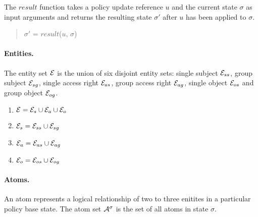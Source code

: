 \documentclass[10pt, twocolumn]{article}
\begin{document}
        The $result$ function takes a policy update reference $u$ and the
        current state $\sigma$ as input arguments and returns the resulting
        state $\sigma'$ after $u$ has been applied to $\sigma$.

        \begin{quote}
          $\sigma'$ = $result$($u$, $\sigma$)
        \end{quote}

        \paragraph{Entities.}

          The entity set ${\cal E}$ is the union of six disjoint entity sets:
          single subject ${\cal E}_{ss}$, group subject ${\cal E}_{sg}$,
          single access right ${\cal E}_{as}$, group access right
          ${\cal E}_{ag}$, single object ${\cal E}_{os}$ and group object
          ${\cal E}_{og}$.

          \begin{enumerate}
            \item
              ${\cal E} = {\cal E}_{s} \cup {\cal E}_{a} \cup {\cal E}_{o}$
            \item
              ${\cal E}_{s} = {\cal E}_{ss} \cup {\cal E}_{sg}$
            \item
              ${\cal E}_{a} = {\cal E}_{as} \cup {\cal E}_{ag}$
            \item
              ${\cal E}_{o} = {\cal E}_{os} \cup {\cal E}_{og}$
          \end{enumerate}

        \paragraph{Atoms.}

          An atom represents a logical relationship of two to three enitites
          in a particular policy base state. The atom set ${\cal A}^{\sigma}$
          is the set of all atoms in state $\sigma$.
\end{document}
